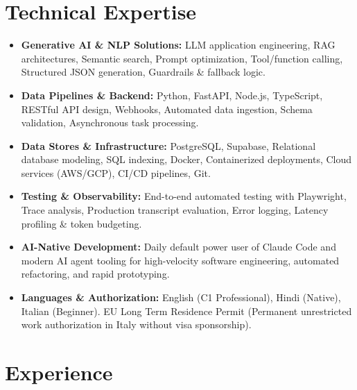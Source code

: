 \documentclass[10pt,a4paper]{article}
\begin{document}
\section{Technical Expertise}
\begin{itemize}
  \item \textbf{Generative AI \& NLP Solutions:} LLM application engineering, RAG architectures, Semantic search, Prompt optimization, Tool/function calling, Structured JSON generation, Guardrails \& fallback logic.
  \item \textbf{Data Pipelines \& Backend:} Python, FastAPI, Node.js, TypeScript, RESTful API design, Webhooks, Automated data ingestion, Schema validation, Asynchronous task processing.
  \item \textbf{Data Stores \& Infrastructure:} PostgreSQL, Supabase, Relational database modeling, SQL indexing, Docker, Containerized deployments, Cloud services (AWS/GCP), CI/CD pipelines, Git.
  \item \textbf{Testing \& Observability:} End-to-end automated testing with Playwright, Trace analysis, Production transcript evaluation, Error logging, Latency profiling \& token budgeting.
  \item \textbf{AI-Native Development:} Daily default power user of Claude Code and modern AI agent tooling for high-velocity software engineering, automated refactoring, and rapid prototyping.
  \item \textbf{Languages \& Authorization:} English (C1 Professional), Hindi (Native), Italian (Beginner). EU Long Term Residence Permit (Permanent unrestricted work authorization in Italy without visa sponsorship).
\end{itemize}

\section{Experience}
\end{document}
